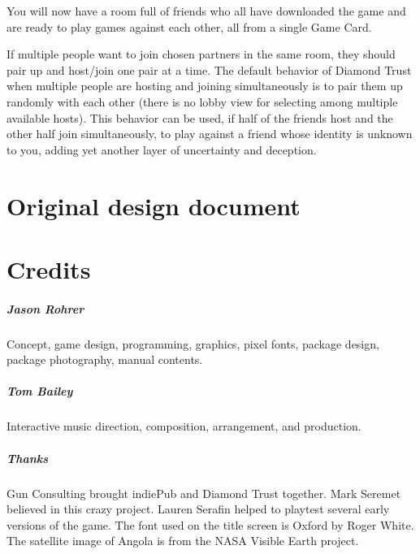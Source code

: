 \documentclass[8pt]{extbook}
\begin{document}
You will now have a room full of friends who all have downloaded the game and are ready to play games against each other, all from a single Game Card.

If multiple people want to join chosen partners in the same room, they should pair up and host/join one pair at a time.  The default behavior of Diamond Trust when multiple people are hosting and joining simultaneously is to pair them up randomly with each other (there is no lobby view for selecting among multiple available hosts).  This behavior can be used, if half of the friends host and the other half join simultaneously, to play against a friend whose identity is unknown to you, adding yet another layer of uncertainty and deception.



\part{Original design document}
\addtocounter{chapter}{1}
\setcounter{section}{0}





\part{Credits}
\addtocounter{chapter}{1}
\setcounter{section}{0}

\subsubsection{Jason Rohrer}
Concept, game design, programming, graphics, pixel fonts, package design, package photography, manual contents.

\subsubsection{Tom Bailey}
Interactive music direction, composition, arrangement, and production.

\subsubsection{Thanks}
Gun Consulting brought indiePub and Diamond Trust together.  Mark Seremet believed in this crazy project.  Lauren Serafin helped to playtest several early versions of the game.  The font used on the title screen is Oxford by Roger White.  The satellite image of Angola is from the NASA Visible Earth project.
\end{document}
